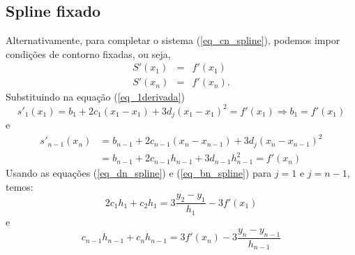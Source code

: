 \subsection{Spline fixado}

Alternativamente, para completar o sistema (\ref{eq_cn_spline}), podemos impor condições de contorno fixadas, ou seja,
\begin{eqnarray*}
S'(x_1)&=&f'(x_1)\\
S'(x_n)&=&f'(x_n).
\end{eqnarray*}
Substituindo na equação (\ref{eq_1derivada})
\begin{equation}
s'_1(x_1)=b_1+2c_1(x_1-x_1)+3d_j(x_1-x_1)^2=f'(x_1)\Longrightarrow b_1=f'(x_1)  
\end{equation}
e
\begin{equation}
  \begin{split}
s'_{n-1}(x_n) &= b_{n-1}+2c_{n-1}(x_n-x_{n-1})+3d_j(x_n-x_{n-1})^2 \\
&= b_{n-1}+2c_{n-1}h_{n-1}+3d_{n-1}h_{n-1}^2=f'(x_n)
  \end{split}
\end{equation}
Usando as equações (\ref{eq_dn_spline}) e (\ref{eq_bn_spline}) para $j=1$ e $j=n-1$, temos:
\begin{equation}
2c_1h_1+c_{2}h_1=3\frac{y_{2}-y_1}{h_1}-3f'(x_1)  
\end{equation}
e
\begin{equation}
c_{n-1}h_{n-1}+c_{n}h_{n-1}=3f'(x_n)-3\frac{y_{n}-y_{n-1}}{h_{n-1}}  
\end{equation}

